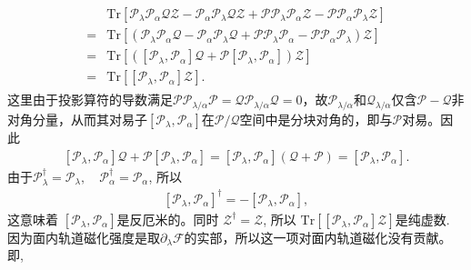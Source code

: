 \documentclass[10pt, oneside]{article}
\begin{document}
\begin{align}
	\begin{split}
		&\mathrm{Tr} \left[\mathcal{P}_{\lambda} \mathcal{P}_{\alpha} \mathcal{Q} \mathcal{Z} -\mathcal{P}_{\alpha} \mathcal{P}_{\lambda} \mathcal{Q} \mathcal{Z} + \mathcal{P} \mathcal{P}_{\lambda} \mathcal{P}_{\alpha} \mathcal{Z} -  \mathcal{P} \mathcal{P}_{\alpha} \mathcal{P}_{\lambda} \mathcal{Z} \right] \\
		= &\mathrm{Tr} \left[\left(\mathcal{P}_{\lambda} \mathcal{P}_{\alpha} \mathcal{Q}  -\mathcal{P}_{\alpha} \mathcal{P}_{\lambda} \mathcal{Q} + \mathcal{P} \mathcal{P}_{\lambda} \mathcal{P}_{\alpha}  -  \mathcal{P} \mathcal{P}_{\alpha} \mathcal{P}_{\lambda}\right)\mathcal{Z}\right] \\
		= & \mathrm{Tr} \left[ \left( \left[\mathcal{P}_{\lambda}, \mathcal{P}_{\alpha}\right] \mathcal{Q} + \mathcal{P} \left[\mathcal{P}_{\lambda}, \mathcal{P}_{\alpha}\right]   \right)  \mathcal{Z}   \right] \\
		= & \mathrm{Tr} \left[ \left[\mathcal{P}_{\lambda}, \mathcal{P}_{\alpha}\right]  \mathcal{Z} \right].
	\end{split}
\end{align}
这里由于投影算符的导数满足\(\mathcal{P} \mathcal{P}_{\lambda/\alpha} \mathcal{P} = \mathcal{Q} \mathcal{P}_{\lambda/\alpha} \mathcal{Q} = 0\)，故\(\mathcal{P}_{\lambda/\alpha}\)和\(\mathcal{Q}_{\lambda/\alpha}\)仅含\(\mathcal{P}-\mathcal{Q}\)非对角分量，从而其对易子\(\left[\mathcal{P}_{\lambda}, \mathcal{P}_{\alpha}\right]\)在\(\mathcal{P}/\mathcal{Q}\)空间中是分块对角的，即与\(\mathcal{P}\)对易。因此
\begin{align}
	\left[\mathcal{P}_{\lambda}, \mathcal{P}_{\alpha}\right] \mathcal{Q} + \mathcal{P} \left[\mathcal{P}_{\lambda}, \mathcal{P}_{\alpha}\right] = \left[\mathcal{P}_{\lambda}, \mathcal{P}_{\alpha}\right] \left(\mathcal{Q} + \mathcal{P}\right) = \left[\mathcal{P}_{\lambda}, \mathcal{P}_{\alpha}\right].
\end{align}
由于\(\mathcal{P}_{\lambda}^{\dagger} = \mathcal{P}_{\lambda}, \quad \mathcal{P}_{\alpha}^{\dagger} = \mathcal{P}_{\alpha}\), 所以
\begin{align}
	\left[\mathcal{P}_{\lambda}, \mathcal{P}_{\alpha}\right]^{\dagger} = - \left[\mathcal{P}_{\lambda}, \mathcal{P}_{\alpha}\right],
\end{align}
这意味着 \(\left[\mathcal{P}_{\lambda}, \mathcal{P}_{\alpha}\right] \)是反厄米的。同时 \(\mathcal{Z}^{\dagger} = \mathcal{Z}\), 所以 \(\mathrm{Tr} \left[\left[\mathcal{P}_{\lambda}, \mathcal{P}_{\alpha}\right] \mathcal{Z}\right]\)是纯虚数. 因为面内轨道磁化强度是取\(\partial_{\lambda} \mathcal{F}\)的实部，所以这一项对面内轨道磁化没有贡献。即,
\end{document}
